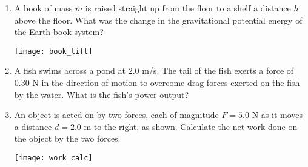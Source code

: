 \documentclass[11pt]{article}
\begin{document}
\begin{enumerate}


\item A book of mass $m$ is raised straight up from the floor to a shelf a distance $h$ above the floor. What was the change in the gravitational potential energy of the Earth-book system?\\
\begin{minipage}[t]{.7\lw}
\end{minipage}\hfill
\begin{minipage}[t]{.2\lw}
\vspace{.2in}
\flushright
\texttt{[image: book\_lift]}
\end{minipage}

\item A fish swims across a pond at $2.0$ m/s. The tail of the fish exerts a force of $0.30$ N in the direction of motion to overcome drag forces exerted on the fish by the water. What is the fish's power output?

\item An object is acted on by two forces, each of magnitude $F=5.0$ N as it moves a distance $d=2.0$ m to the right, as shown. Calculate the net work done on the object by the two forces.\\
\begin{minipage}[t]{.45\lw}
\end{minipage}\hfill
\begin{minipage}[t]{.5\lw}
\vspace{0in}
\flushright
\texttt{[image: work\_calc]}
\end{minipage}


\end{enumerate}
\end{document}

